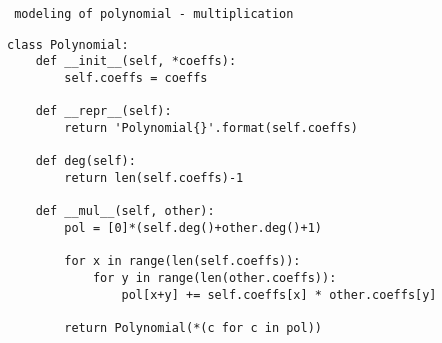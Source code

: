 \begin{center}
\texttt{ modeling of polynomial - multiplication}
\end{center}
\begin{verbatim}
class Polynomial:
	def __init__(self, *coeffs):
		self.coeffs = coeffs

	def __repr__(self):
		return 'Polynomial{}'.format(self.coeffs)

	def deg(self):
		return len(self.coeffs)-1

	def __mul__(self, other):
		pol = [0]*(self.deg()+other.deg()+1)
		
		for x in range(len(self.coeffs)):
			for y in range(len(other.coeffs)):
				pol[x+y] += self.coeffs[x] * other.coeffs[y]

		return Polynomial(*(c for c in pol))
\end{verbatim}
